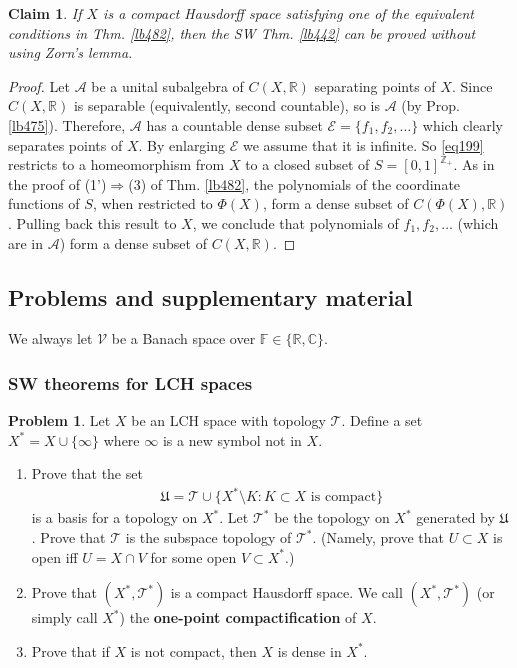 \documentclass[12pt,b5paper,notitlepage]{article}
\theoremstyle{definition}
\newtheorem{prob}{\color{red}Problem}[section]
\theoremstyle{plain}
\newtheorem{claim}[df]{Claim}
\newcommand{\fk}{\mathfrak}
\newcommand{\mc}{\mathcal}
\newcommand{\scr}{\mathscr}
\newcommand{\Cbb}{\mathbb C}
\newcommand{\Zbb}{\mathbb Z}
\newcommand{\Rbb}{\mathbb R}
\newcommand{\Fbb}{\mathbb F}
\numberwithin{equation}{section}
\begin{document}
\begin{claim}
If $X$ is a compact Hausdorff space satisfying one of the equivalent conditions in Thm. \ref{lb482}, then the SW Thm. \ref{lb442} can be proved without using Zorn's lemma.
\end{claim}


\begin{proof}
Let $\scr A$ be a unital subalgebra of $C(X,\Rbb)$ separating points of $X$. Since $C(X,\Rbb)$ is separable (equivalently, second countable), so is $\scr A$ (by Prop. \ref{lb475}). Therefore, $\scr A$ has a countable dense subset $\mc E=\{f_1,f_2,\dots\}$ which clearly separates points of $X$. By enlarging $\mc E$ we assume that it is infinite. So \eqref{eq199} restricts to a homeomorphism from $X$ to a closed subset of $S=[0,1]^{\Zbb_+}$. As in the proof of (1')$\Rightarrow$(3) of Thm. \ref{lb482}, the polynomials of the coordinate functions of $S$, when restricted to $\Phi(X)$, form a dense subset of $C(\Phi(X),\Rbb)$. Pulling back this result to $X$, we conclude that polynomials of $f_1,f_2,\dots$ (which are in $\scr A$) form a dense subset of $C(X,\Rbb)$.
\end{proof}


\subsection{Problems and supplementary material}


We always let $\mc V$ be a Banach space over $\Fbb\in\{\Rbb,\Cbb\}$.

\subsubsection{SW theorems for LCH spaces}

\begin{prob}\label{lb431}
Let $X$ be an LCH space with topology $\mc T$. Define a set $X^*=X\cup\{\infty\}$ where $\infty$ is a new symbol not in $X$. 
\begin{enumerate}
\item Prove that the set
\begin{align*}
\fk U=\mc T\cup\{X^*\setminus K:K\subset X\text{ is compact}\}
\end{align*}
is a basis for a topology on $X^*$. Let $\mc T^*$ be the topology on $X^*$ generated by $\fk U$. Prove that $\mc T$ is the subspace topology of $\mc T^*$. (Namely, prove that $U\subset X$ is open iff $U=X\cap V$ for some open $V\subset X^*$.)
\item Prove that $(X^*,\mc T^*)$ is a compact Hausdorff space. We call $(X^*,\mc T^*)$ (or simply call $X^*$) the \textbf{one-point compactification}  of $X$.
\item Prove that if $X$ is not compact, then $X$ is dense in $X^*$.
\end{enumerate}
\end{prob}
\end{document}
